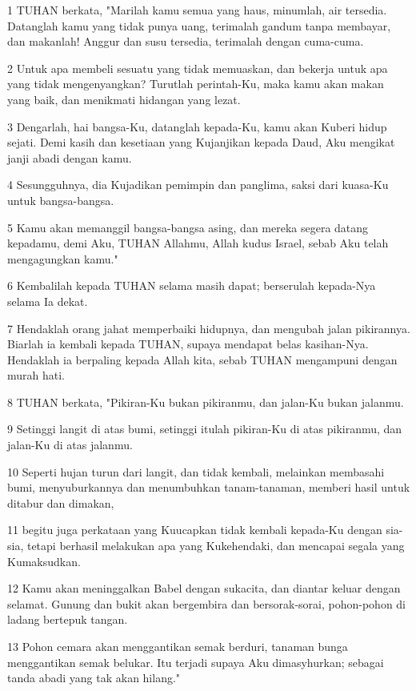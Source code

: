 \par 1 TUHAN berkata, "Marilah kamu semua yang haus, minumlah, air tersedia. Datanglah kamu yang tidak punya uang, terimalah gandum tanpa membayar, dan makanlah! Anggur dan susu tersedia, terimalah dengan cuma-cuma.
\par 2 Untuk apa membeli sesuatu yang tidak memuaskan, dan bekerja untuk apa yang tidak mengenyangkan? Turutlah perintah-Ku, maka kamu akan makan yang baik, dan menikmati hidangan yang lezat.
\par 3 Dengarlah, hai bangsa-Ku, datanglah kepada-Ku, kamu akan Kuberi hidup sejati. Demi kasih dan kesetiaan yang Kujanjikan kepada Daud, Aku mengikat janji abadi dengan kamu.
\par 4 Sesungguhnya, dia Kujadikan pemimpin dan panglima, saksi dari kuasa-Ku untuk bangsa-bangsa.
\par 5 Kamu akan memanggil bangsa-bangsa asing, dan mereka segera datang kepadamu, demi Aku, TUHAN Allahmu, Allah kudus Israel, sebab Aku telah mengagungkan kamu."
\par 6 Kembalilah kepada TUHAN selama masih dapat; berserulah kepada-Nya selama Ia dekat.
\par 7 Hendaklah orang jahat memperbaiki hidupnya, dan mengubah jalan pikirannya. Biarlah ia kembali kepada TUHAN, supaya mendapat belas kasihan-Nya. Hendaklah ia berpaling kepada Allah kita, sebab TUHAN mengampuni dengan murah hati.
\par 8 TUHAN berkata, "Pikiran-Ku bukan pikiranmu, dan jalan-Ku bukan jalanmu.
\par 9 Setinggi langit di atas bumi, setinggi itulah pikiran-Ku di atas pikiranmu, dan jalan-Ku di atas jalanmu.
\par 10 Seperti hujan turun dari langit, dan tidak kembali, melainkan membasahi bumi, menyuburkannya dan menumbuhkan tanam-tanaman, memberi hasil untuk ditabur dan dimakan,
\par 11 begitu juga perkataan yang Kuucapkan tidak kembali kepada-Ku dengan sia-sia, tetapi berhasil melakukan apa yang Kukehendaki, dan mencapai segala yang Kumaksudkan.
\par 12 Kamu akan meninggalkan Babel dengan sukacita, dan diantar keluar dengan selamat. Gunung dan bukit akan bergembira dan bersorak-sorai, pohon-pohon di ladang bertepuk tangan.
\par 13 Pohon cemara akan menggantikan semak berduri, tanaman bunga menggantikan semak belukar. Itu terjadi supaya Aku dimasyhurkan; sebagai tanda abadi yang tak akan hilang."

